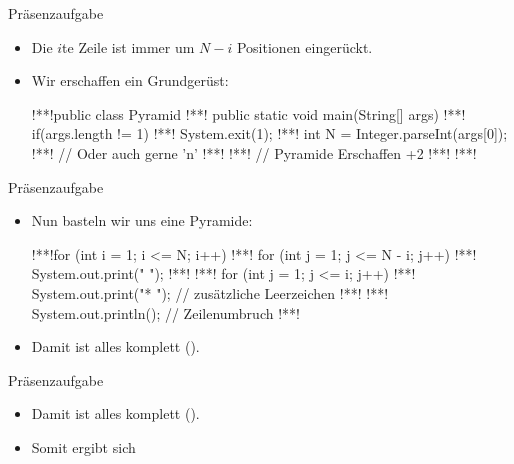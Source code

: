 \begin{frame}[t,fragile]{Präsenzaufgabe}
\begin{itemize}[<+(1)->]
    \item Die \(i\)te Zeile ist immer um \(N - i\) Positionen eingerückt.
    \item Wir erschaffen ein Grundgerüst:
\begin{plainjava}
!**!public class Pyramid {
!**!    public static void main(String[] args) {
!**!        if(args.length != 1)
!**!            System.exit(1);
!**!        int N = Integer.parseInt(args[0]);
!**!        // Oder auch gerne 'n'
!**!
!**!        // Pyramide Erschaffen +2
!**!    }
!**!}
\end{plainjava}
\end{itemize}
\end{frame}

\begin{frame}[t,fragile]{Präsenzaufgabe}
\begin{itemize}[<+(1)->]
    \item Nun basteln wir uns eine Pyramide:
\begin{plainjava}
!**!for (int i = 1; i <= N; i++) {
!**!    for (int j = 1; j <= N - i; j++) {
!**!        System.out.print(" ");
!**!    }
!**!    for (int j = 1; j <= i; j++) {
!**!        System.out.print("* "); // zusätzliche Leerzeichen
!**!    }
!**!    System.out.println(); // Zeilenumbruch
!**!}
\end{plainjava}
    \iffull\else\item Damit ist alles komplett ().\fi
\end{itemize}
\end{frame}

\iffull
{}
\begin{frame}[t,fragile]{Präsenzaufgabe}
\begin{itemize}[<+(1)->]
    \item Damit ist alles komplett ().
    \item Somit ergibt sich 
\end{itemize}
\end{frame}
\fi

